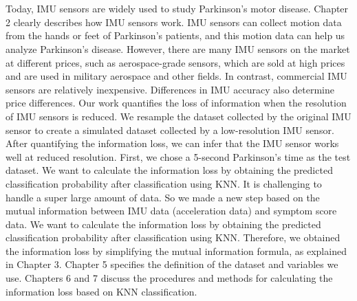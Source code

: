 \\ \hspace*{\fill} \\
Today, IMU sensors are widely used to study Parkinson's motor disease. Chapter 2 clearly describes how IMU sensors work. IMU sensors can collect motion data from the hands or feet of Parkinson's patients, and this motion data can help us analyze Parkinson's disease. However, there are many IMU sensors on the market at different prices, such as aerospace-grade sensors, which are sold at high prices and are used in military aerospace and other fields. In contrast, commercial IMU sensors are relatively inexpensive. Differences in IMU accuracy also determine price differences. Our work quantifies the loss of information when the resolution of IMU sensors is reduced. We resample the dataset collected by the original IMU sensor to create a simulated dataset collected by a low-resolution IMU sensor. After quantifying the information loss, we can infer that the IMU sensor works well at reduced resolution. First, we chose a 5-second Parkinson's time as the test dataset. We want to calculate the information loss by obtaining the predicted classification probability after classification using KNN. It is challenging to handle a super large amount of data. So we made a new step based on the mutual information between IMU data (acceleration data) and symptom score data. We want to calculate the information loss by obtaining the predicted classification probability after classification using KNN. Therefore, we obtained the information loss by simplifying the mutual information formula, as explained in Chapter 3. Chapter 5 specifies the definition of the dataset and variables we use. Chapters 6 and 7 discuss the procedures and methods for calculating the information loss based on KNN classification.

\\ \hspace*{\fill} \\












